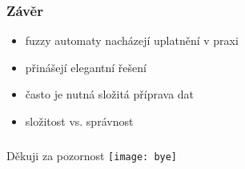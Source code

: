 \documentclass{beamer}
\begin{document}
\begin{frame}	%
\frametitle{Závěr}
\begin{itemize}
	\item fuzzy automaty nacházejí uplatnění v praxi
	\item přinášejí elegantní řešení
	\item často je nutná složitá příprava dat
	\item složitost vs. správnost
\end{itemize}
\end{frame}

\begin{frame}	%
\frametitle{}
\begin{center}
\huge{Děkuji za pozornost}
\vfill
\texttt{[image: bye]}
\end{center}
\end{frame}
\end{document}
